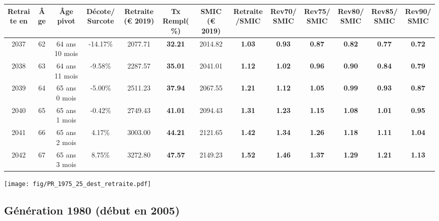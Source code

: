 { \scriptsize \begin{center} 
\begin{tabular}[htb]{|c|c||c|c||c|c||c||c|c|c|c|c|c|} 
\hline 
 Retraite en &  Âge &  Âge pivot &  Décote/Surcote &  Retraite (\euro{} 2019) &  Tx Rempl(\%) &  SMIC (\euro{} 2019) &  Retraite/SMIC &  Rev70/SMIC &  Rev75/SMIC &  Rev80/SMIC &  Rev85/SMIC &  Rev90/SMIC \\ 
\hline \hline 
 2037 &  62 &  64 ans 10 mois &  -14.17\% &  2077.71 &  {\bf 32.21} &  2014.82 &  {\bf 1.03} &  {\bf {\color{red} 0.93}} &  {\bf {\color{red} 0.87}} &  {\bf {\color{red} 0.82}} &  {\bf {\color{red} 0.77}} &  {\bf {\color{red} 0.72}} \\ 
\hline 
 2038 &  63 &  64 ans 11 mois &  -9.58\% &  2287.57 &  {\bf 35.01} &  2041.01 &  {\bf 1.12} &  {\bf 1.02} &  {\bf {\color{red} 0.96}} &  {\bf {\color{red} 0.90}} &  {\bf {\color{red} 0.84}} &  {\bf {\color{red} 0.79}} \\ 
\hline 
 2039 &  64 &  65 ans 0 mois &  -5.00\% &  2511.23 &  {\bf 37.94} &  2067.55 &  {\bf 1.21} &  {\bf 1.12} &  {\bf 1.05} &  {\bf {\color{red} 0.99}} &  {\bf {\color{red} 0.93}} &  {\bf {\color{red} 0.87}} \\ 
\hline 
 2040 &  65 &  65 ans 1 mois &  -0.42\% &  2749.43 &  {\bf 41.01} &  2094.43 &  {\bf 1.31} &  {\bf 1.23} &  {\bf 1.15} &  {\bf 1.08} &  {\bf 1.01} &  {\bf {\color{red} 0.95}} \\ 
\hline 
 2041 &  66 &  65 ans 2 mois &  4.17\% &  3003.00 &  {\bf 44.21} &  2121.65 &  {\bf 1.42} &  {\bf 1.34} &  {\bf 1.26} &  {\bf 1.18} &  {\bf 1.11} &  {\bf 1.04} \\ 
\hline 
 2042 &  67 &  65 ans 3 mois &  8.75\% &  3272.80 &  {\bf 47.57} &  2149.23 &  {\bf 1.52} &  {\bf 1.46} &  {\bf 1.37} &  {\bf 1.29} &  {\bf 1.21} &  {\bf 1.13} \\ 
\hline 
\hline 
\end{tabular} 
\end{center} } 

 \begin{center}\texttt{[image: fig/PR\_1975\_25\_dest\_retraite.pdf]}\end{center} \label{fig/PR_1975_25_dest_retraite.pdf} 

\newpage 
 
\subsection{Génération 1980 (début en 2005)} 

